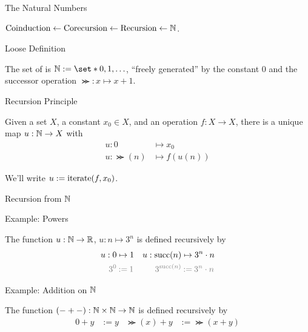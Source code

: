 
\begin{frame}{The Natural Numbers}
  
  \par $\text{Coinduction} \leftarrow \text{Corecursion} \leftarrow \text{Recursion} \leftarrow \mathbb{N}$.

  \pause

  \begin{block}{Loose Definition}
    \par The set of  is $\N := \set*{0, 1, \dots}$, ``freely generated'' by the constant $0$ and the successor operation $\Succ : x \mapsto x + 1$.
  \end{block}

  \pause

  \begin{block}{Recursion Principle}
    \par Given a set $X$, a constant $x_0 \in X$, and an operation $f : X \to X$, there is a unique map $u : \mathbb{N} \to X$ with
    \begin{align*}
      u : 0 &\mapsto x_0 \\
      u : \Succ (n) &\mapsto f (u (n))
    \end{align*}
    \par We'll write $u := \operatorname{iterate} (f, x_0)$.
  \end{block}

\end{frame}

\begin{frame}{Recursion from $\mathbb{N}$}

  \begin{block}{Example: Powers}
    \par The function $u : \mathbb{N} \to \mathbb{R}$, $u : n \mapsto 3^n$ is defined recursively by
    \begin{align*}
      u : 0 &\mapsto 1
      & u : \Succ (n) &\mapsto 3^n \cdot n
      \\
      \textcolor{gray}{3^0} &\mathbin{\textcolor{gray}{:=}} \textcolor{gray}{1}
      & \textcolor{gray}{3^{\Succ (n)}} &\mathbin{\textcolor{gray}{:=}} \textcolor{gray}{3^n \cdot n}
    \end{align*}
  \end{block}

  \begin{block}{Example: Addition on $\mathbb{N}$}
    \par The function $({-} + {-}) : \mathbb{N} \times \mathbb{N} \to \mathbb{N}$ is defined recursively by
    \begin{align*}
      0 + y           &:= y
      & \Succ(x) + y  &:= \Succ(x + y)
    \end{align*}
  \end{block}

\end{frame}
